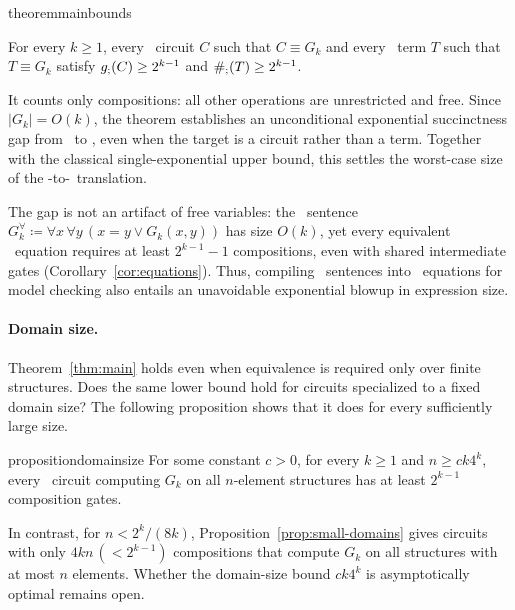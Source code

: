 \begin{restatable}{theorem}{mainbounds}\label{thm:main}\label{main:G}

For every $k\ge 1$, every \CoR\ circuit $C$ such that
$C\equiv G_k$ and every \CoR\ term $T$ such that
$T\equiv G_k$ satisfy
$g_{;}(C) \ge 2^{k-1}$ and $\#_{;}(T) \ge 2^{k-1}$.
\end{restatable}
It counts only compositions: all other operations are unrestricted and free.
Since $|G_k|=O(k)$, the theorem establishes an unconditional exponential succinctness gap from \FOthree\ to \CoR, even when the target is a circuit rather than a term.
%
Together with the classical single-exponential upper bound, this settles the worst-case size of the \FOthree-to-\CoR\ translation.

The gap is not an artifact of free variables: the \FOthree\ sentence
$G_k^\forall\coloneqq\forall x\,\forall y\,(x=y\lor G_k(x,y))$
has size $O(k)$, yet every equivalent \CoR\ equation requires at
least $2^{k-1}-1$ compositions, even with shared intermediate gates
(Corollary~\ref{cor:equations}).
Thus, compiling \FOthree\ sentences into \CoR\ equations for model
checking also entails an unavoidable exponential blowup in expression size.

\paragraph{Domain size.}
Theorem~\ref{thm:main} holds even when equivalence is required only over finite structures.
Does the same lower bound hold for circuits specialized to a fixed domain size?
The following proposition shows that it does for every sufficiently large size.

\begin{restatable}{proposition}{domainsize}\label{prop:domain-size}
For some constant $c>0$, for every $k\ge1$
and $n\ge ck4^k$, every \CoR\ circuit
computing $G_k$ on all $n$-element structures
has at least $2^{k-1}$ composition gates.
\end{restatable}

In contrast, for $n<2^k/(8k)$, Proposition~\ref{prop:small-domains} gives
circuits with only $4kn\,(< 2^{k-1})$ compositions
that compute $G_k$ on all structures with at most $n$ elements.
Whether the domain-size bound $ck4^k$ is
asymptotically optimal remains open.

